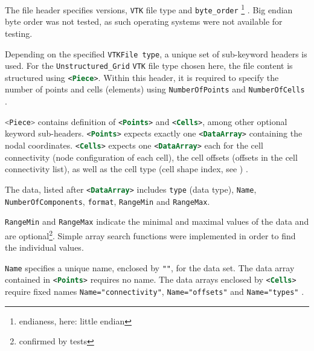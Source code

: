 \bigbreak
The file header specifies versions, \texttt{VTK} file type and \lstinline[language=XML]{byte_order} \footnote{endianess, here: little endian} \cite{Kit}. Big endian byte order was not tested, as such operating systems were not available for testing.

\bigbreak
Depending on the specified \lstinline[language=XML]{VTKFile type}, a unique set of sub-keyword headers is used. For the \lstinline[language=XML]{Unstruc}\allowbreak\lstinline[language=XML]{tured}\allowbreak\lstinline[language=XML]{_Grid} \texttt{VTK} file type chosen here, the file content is structured using \lstinline[language=XML]{<Piece>}. Within this header, it is required to specify the number of points and cells (elements) using \lstinline[language=XML]{NumberOfPoints} and \lstinline[language=XML]{NumberOfCells} \cite{Kit}.

\bigbreak
\lstinline[language=C]{<Piece>} contains definition of \lstinline[language=XML]{<Points>} and \lstinline[language=XML]{<Cells>}, among other optional keyword sub-headers. \lstinline[language=XML]{<Points>} expects exactly one \lstinline[language=XML]{<DataArray>} containing the nodal coordinates. \lstinline[language=XML]{<Cells>} expects one \lstinline[language=XML]{<DataArray>} each for the cell connectivity (node configuration of each cell), the cell offsets (offsets in the cell connectivity list), as well as the cell type (cell shape index, see \cite{Kit}) \cite{Bun09}.

\bigbreak
The data, listed after \lstinline[language=XML]{<DataArray>} includes \lstinline[language=XML]{type} (data type), \lstinline[language=XML]{Name}, \lstinline[language=XML]{NumberOfComponents}, \lstinline[language=XML]{format}, \lstinline[language=XML]{RangeMin} and \lstinline[language=XML]{RangeMax}.

\bigbreak
\lstinline[language=XML]{RangeMin} and \lstinline[language=XML]{RangeMax} indicate the minimal and maximal values of the data and are optional\footnote{confirmed by tests}. Simple array search functions were implemented in order to find the individual values.

\bigbreak
\lstinline[language=C]{Name} specifies a unique name, enclosed by \texttt{""}, for the data set. The data array contained in \lstinline[language=XML]{<Points>} requires no name. The data arrays enclosed by \lstinline[language=XML]{<Cells>} require fixed names \lstinline[language=XML]{Name="connectivity"}, \lstinline[language=XML]{Name="offsets"} and \lstinline[language=XML]{Name="types"} \cite{Kit}.  

